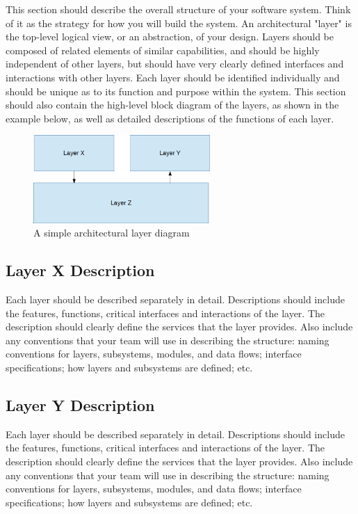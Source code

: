 This section should describe the overall structure of your software system. Think of it as the strategy for how you will build the system. An architectural "layer" is the top-level logical view, or an abstraction, of your design. Layers should be composed of related elements of similar capabilities, and should be highly independent of other layers, but should have very clearly defined interfaces and interactions with other layers. Each layer should be identified individually and should be unique as to its function and purpose within the system. This section should also contain the high-level block diagram of the layers, as shown in the example below, as well as detailed descriptions of the functions of each layer.

\begin{figure}[h!]
	\centering
 	\includegraphics[width=0.60\textwidth]{images/layers}
 \caption{A simple architectural layer diagram}
\end{figure}

\subsection{Layer X Description}
Each layer should be described separately in detail. Descriptions should include the features, functions, critical interfaces and interactions of the layer. The description should clearly define the services that the layer provides. Also include any conventions that your team will use in describing the structure: naming conventions for layers, subsystems, modules, and data flows; interface specifications; how layers and subsystems are defined; etc. 

\subsection{Layer Y Description}
Each layer should be described separately in detail. Descriptions should include the features, functions, critical interfaces and interactions of the layer. The description should clearly define the services that the layer provides. Also include any conventions that your team will use in describing the structure: naming conventions for layers, subsystems, modules, and data flows; interface specifications; how layers and subsystems are defined; etc. 

